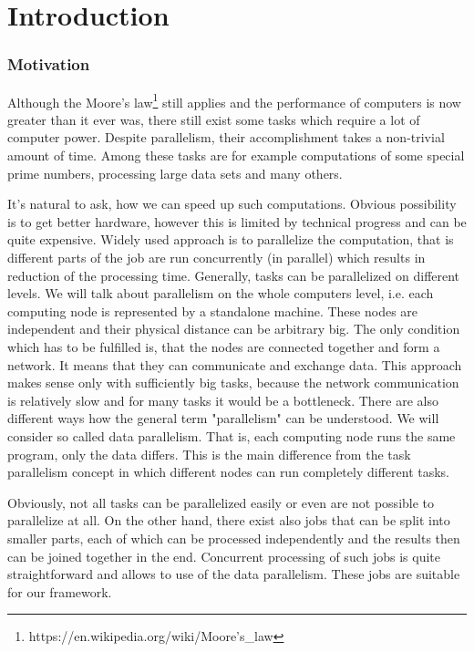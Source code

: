\chapter*{Introduction}
\subsection*{Motivation}

Although the Moore's law\footnote{https://en.wikipedia.org/wiki/Moore's\_law} still applies and the performance of computers is now greater than it ever was, there still exist some tasks which require a lot of computer power. Despite parallelism, their accomplishment takes a non-trivial amount of time. Among these tasks are for example computations of some special prime numbers, processing large data sets and many others.

It's natural to ask, how we can speed up such computations. Obvious possibility is to get better hardware, however this is limited by technical progress and can be quite expensive. Widely used approach is to parallelize the computation, that is different parts of the job are run concurrently (in parallel) which results in reduction of the processing time. Generally, tasks can be parallelized on different levels. We will talk about parallelism on the whole computers level, i.e. each computing node is represented by a standalone machine. These nodes are independent and their physical distance can be arbitrary big. The only condition which has to be fulfilled is, that the nodes are connected together and form a network. It means that they can communicate and exchange data. This approach makes sense only with sufficiently big tasks, because the network communication is relatively slow and for many tasks it would be a bottleneck. There are also different ways how the general term "parallelism" can be understood. We will consider so called data parallelism. That is, each computing node runs the same program, only the data differs. This is the main difference from the task parallelism concept in which different nodes can run completely different tasks.

Obviously, not all tasks can be parallelized easily or even are not possible to parallelize at all. On the other hand, there exist also jobs that can be split into smaller parts, each of which can be processed independently and the results then can be joined together in the end. Concurrent processing of such jobs is quite straightforward and allows to use of the data parallelism. These jobs are suitable for our framework.

